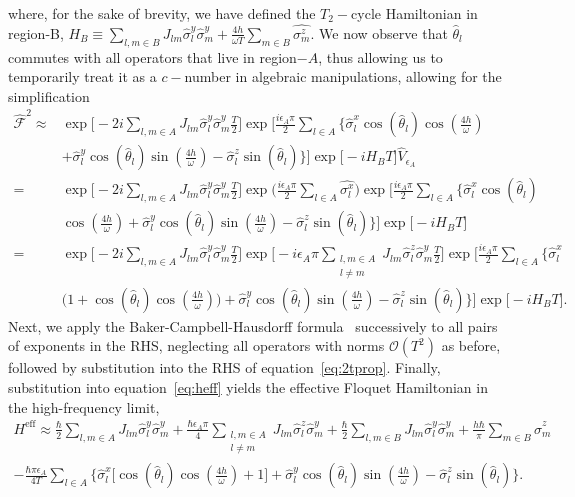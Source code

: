 \documentclass[12pt]{iopart}
\begin{document}
where, for the sake of brevity, we have defined the $T_2-$cycle Hamiltonian in region-B, $\displaystyle {H}_B \equiv \sum_{l,m\in B} J_{lm} \hat{\sigma}^y_l\hat{\sigma}^y_m + \frac{4h}{\omega T}\sum_{m \in B}\hat{\sigma^z_m}$. We now observe that $\hat{\theta}_l$ commutes with all operators that live in region$-A$, thus allowing us to temporarily treat it as a $c-$number in algebraic manipulations, allowing for the simplification
\begin{align}		
    \hat{\mathcal{F}}^2 	\approx& \exp\Bigg[-2i  \sum_{l,m\in A}J_{lm} \hat{\sigma}^y_l\hat{\sigma}^y_m\frac{T}{2}\Bigg]\exp\Bigg[\frac{i \epsilon_A \pi}{2}\sum_{l\in A}\Bigg\{\hat{\sigma}^x_l \cos(\hat{\theta}_l)\cos(\frac{4h}{\omega})\nonumber\\
    &+ \hat{\sigma}^y_l \cos(\hat{\theta}_l)\sin(\frac{4h}{\omega})-\hat{\sigma}^z_l \sin(\hat{\theta}_l)\Bigg\}\Bigg] \exp\big[-i H_B T\big]\hat{V}_{\epsilon_A}\nonumber\\
    =&\exp\Bigg[-2i \sum_{l,m\in A}J_{lm} \hat{\sigma}_l^y\hat{\sigma}_m^y\frac{T}{2}\Bigg] \exp\Big(\frac{i\epsilon_A \pi}{2}\sum_{l\in A}\hat{\sigma^x_l}\Big) \exp\Bigg[\frac{i \epsilon_A \pi}{2}\sum_{l\in A}\Bigg\{\hat{\sigma}^x_l \cos(\hat{\theta}_l)\nonumber\\
    & \cos(\frac{4h}{\omega})+\hat{\sigma}^y_l \cos(\hat{\theta}_l)\sin(\frac{4h}{\omega})-\hat{\sigma}^z_l \sin(\hat{\theta}_l)\Bigg\}\Bigg]\exp\big[-i H_B T\big]\nonumber\\
    =&\exp\Bigg[-2i\sum_{l,m\in A}J_{lm}\hat{\sigma}^y_l\hat{\sigma}^y_m \frac{T}{2}\Bigg] \exp\Bigg[-i\epsilon_A \pi \sum_{\substack{l,m \in A\\l\neq m}}J_{lm} \hat{\sigma}^z_l\hat{\sigma}^y_m\frac{T}{2}\Bigg] 
     \exp\Bigg[\frac{i \epsilon_A \pi}{2}\sum_{l\in A}\Bigg\{\hat{\sigma}^x_l\nonumber\\
     &\Bigg(1+ \cos(\hat{\theta}_l)\cos(\frac{4h}{\omega})\Bigg)
    +\hat{\sigma}^y_l \cos(\hat{\theta}_l)\sin(\frac{4h}{\omega})-\hat{\sigma}^z_l \sin(\hat{\theta}_l)\Bigg\}\Bigg] \exp\big[-i H_B T\big].
\end{align}
Next, we apply the Baker-Campbell-Hausdorff formula~\cite{Magnus1954} successively to all pairs of exponents in the RHS, neglecting all operators with norms $\mathcal{O}(T^2)$ as before, followed by substitution into the RHS of equation~\ref{eq:2tprop}. Finally, substitution into equation~\ref{eq:heff} yields the effective Floquet Hamiltonian in the high-frequency limit, 
\begin{multline}
    H^{\mathrm{eff}} \approx\frac{\hbar}{2} \sum_{l,m\in A}J_{lm}\hat{\sigma}_l^y\hat{\sigma}_m^y +\frac{\hbar \epsilon_A \pi}{4} \sum_{\substack{l,m\in A\\l\neq m}} J_{lm}\hat{\sigma}^z_l\hat{\sigma}^y_m + \frac{\hbar}{2}\sum_{l,m\in B}J_{lm}\hat{\sigma}_l^y \hat{\sigma}_m^y + \frac{h\hbar}{\pi}\sum_{m \in B}\hat{\sigma}^z_m \\ -\frac{\hbar \pi \epsilon_A}{4T}\sum_{l\in A}\Bigg\{\hat{\sigma}^x_l \bigg[\cos(\hat{\theta}_l)\cos(\frac{4h}{\omega})+1 \bigg] + \hat{\sigma}^y_l \cos(\hat{\theta}_l)\sin(\frac{4h}{\omega})-\hat{\sigma}^z_l \sin(\hat{\theta}_l)\Bigg\}.
    \label{eq:app:nfloq_eff3}
\end{multline}
\end{document}
